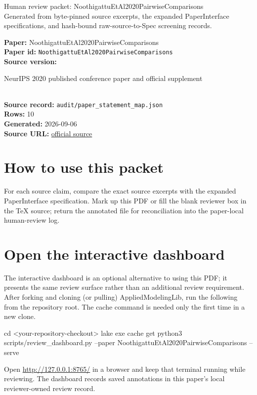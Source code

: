 \documentclass[10pt]{article}
\begin{document}
\fontsize{9}{10}\selectfont

\begin{center}
{\LARGE Human review packet: NoothigattuEtAl2020PairwiseComparisons}\\[0.35em]
\small Generated from byte-pinned source excerpts, the expanded PaperInterface
specifications, and hash-bound raw-source-to-Spec screening records.
\end{center}

\noindent\textbf{Paper:} NoothigattuEtAl2020PairwiseComparisons\\
\textbf{Paper id:} \texttt{NoothigattuEtAl2020PairwiseComparisons}\\
\textbf{Source version:} \parbox[t]{0.76\linewidth}{\raggedright NeurIPS 2020 published conference paper and official supplement}\\
\textbf{Source record:} \texttt{audit/paper\_statement\_map.json}\\
\textbf{Rows:} 10\\
\textbf{Generated:} 2026-09-06\\
\textbf{Source URL:} \href{https://proceedings.neurips.cc/paper_files/paper/2020/hash/cdaa9b682e10c291d3bbadca4c96f5de-Abstract.html}{official source}





\section*{How to use this packet}
For each source claim, compare the exact source excerpts with the expanded
PaperInterface specification. Mark up this PDF or fill the blank reviewer box in the TeX source;
return the annotated file for reconciliation into the paper-local human-review
log.

\section*{Open the interactive dashboard}
The interactive dashboard is an optional alternative to using this PDF; it
presents the same review surface rather than an additional review requirement.
After forking and cloning (or pulling) AppliedModelingLib, run the following from the
repository root. The cache command is needed only the first time in a new clone.
\begin{ReviewVerbatim}
cd <your-repository-checkout>
lake exe cache get
python3 scripts/review_dashboard.py --paper NoothigattuEtAl2020PairwiseComparisons --serve
\end{ReviewVerbatim}
Open \url{http://127.0.0.1:8765/} in a browser and keep that terminal running
while reviewing. The dashboard records saved annotations in this paper's local
reviewer-owned review record.
\end{document}
